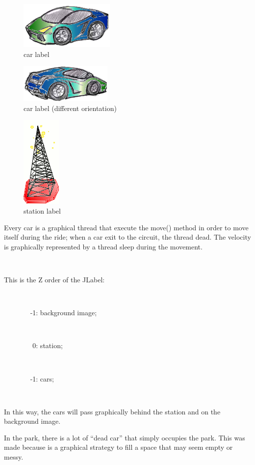 \documentclass[a4paper,titlepage]{article}
\begin{document}
\begin{figure}[!h]
\centering
\includegraphics[scale=0.2]{../car.png}
\caption{car label}
\end{figure}


\begin{figure}[!h]
\centering
\includegraphics[scale=0.2]{../car2.png}
\caption{car label (different orientation)}
\end{figure}

\begin{figure}[!h]
\centering
\includegraphics[scale=0.5]{../radio.png}
\caption{station label}
\end{figure}


Every car is a graphical thread that execute the move() method in order to move itself during the ride; when a car exit to the circuit, the thread dead. The velocity is graphically represented by a thread sleep during the movement.

~

This is the Z order of the JLabel:

~

~ ~ ~ ~ ~-1: background image;

~

~ ~ ~ ~ ~ 0: station;

~

~ ~ ~ ~ ~-1: cars;

~

In this way, the cars will pass graphically behind the station and on the background image.


In the park, there is a lot of ``dead car'' that simply occupies the park. This was made because is a graphical strategy to fill a space that may seem empty or messy.
\end{document}
